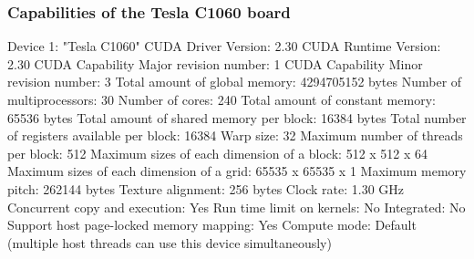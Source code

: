 \begin{frame}[fragile]
%
  \frametitle{Capabilities of the Tesla C1060 board}
%
  \begin{shell}[basicstyle=\tt\bfseries\tiny]

Device 1: "Tesla C1060"
  CUDA Driver Version:                           2.30
  CUDA Runtime Version:                          2.30
  CUDA Capability Major revision number:         1
  CUDA Capability Minor revision number:         3
  Total amount of global memory:                 4294705152 bytes
  Number of multiprocessors:                     30
  Number of cores:                               240
  Total amount of constant memory:               65536 bytes
  Total amount of shared memory per block:       16384 bytes
  Total number of registers available per block: 16384
  Warp size:                                     32
  Maximum number of threads per block:           512
  Maximum sizes of each dimension of a block:    512 x 512 x 64
  Maximum sizes of each dimension of a grid:     65535 x 65535 x 1
  Maximum memory pitch:                          262144 bytes
  Texture alignment:                             256 bytes
  Clock rate:                                    1.30 GHz
  Concurrent copy and execution:                 Yes
  Run time limit on kernels:                     No
  Integrated:                                    No
  Support host page-locked memory mapping:       Yes
  Compute mode:                                  Default
                                                 (multiple host threads can 
                                                 use this device simultaneously)
  \end{shell}
%
\end{frame}

